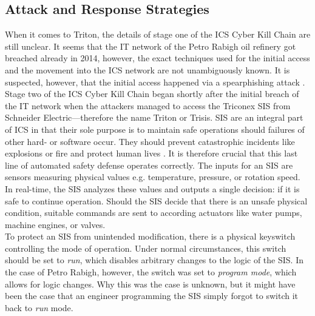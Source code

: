 \documentclass[runningheads]{llncs}
\begin{document}
\subsection{Attack and Response Strategies}
\label{subsection:triton-attack-response}
When it comes to Triton, the details of stage one of the ICS Cyber Kill Chain are still unclear.
It seems that the IT network of the Petro Rabigh oil refinery got breached already in 2014, however, the exact techniques used for the initial access and the movement into the ICS network are not unambiguously known.
It is suspected, however, that the initial access happened via a spearphishing attack \cite{nohe.19}.
\\
Stage two of the ICS Cyber Kill Chain began shortly after the initial breach of the IT network when the attackers managed to access the Triconex SIS from Schneider Electric---therefore the name Triton or Trisis.
SIS are an integral part of ICS in that their sole purpose is to maintain safe operations should failures of other hard- or software occur.
They should prevent catastrophic incidents like explosions or fire and protect human lives \cite{pinto.18}.
It is therefore crucial that this last line of automated safety defense operates correctly.
The inputs for an SIS are sensors measuring physical values e.g. temperature, pressure, or rotation speed.
In real-time, the SIS analyzes these values and outputs a single decision: if it is safe to continue operation.
Should the SIS decide that there is an unsafe physical condition, suitable commands are sent to according actuators like water pumps, machine engines, or valves. \cite{dragos.17}\\
To protect an SIS from unintended modification, there is a physical keyswitch controlling the mode of operation.
Under normal circumstances, this switch should be set to \textit{run}, which disables arbitrary changes to the logic of the SIS.
In the case of Petro Rabigh, however, the switch was set to \textit{program mode}, which allows for logic changes.
Why this was the case is unknown, but it might have been the case that an engineer programming the SIS simply forgot to switch it back to \textit{run} mode.
\end{document}
